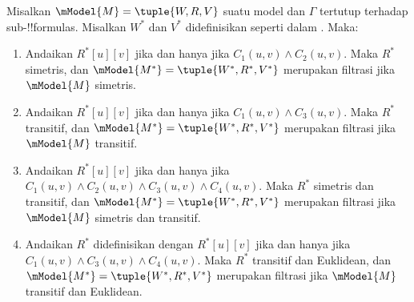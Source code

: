 \documentclass[../../../include/open-logic-section]{subfiles}
\begin{document}
\begin{thm}
  Misalkan $\mModel{M} =\tuple{W,R,V}$ suatu model dan $\Gamma$ tertutup
  terhadap sub-!!{formula}s. Misalkan $W^*$ dan $V^*$ didefinisikan seperti
  dalam . Maka:
  \begin{enumerate}
  \item Andaikan $R^*[u][v]$ jika dan hanya jika $C_1(u, v) \land
    C_2(u,v)$. Maka $R^*$ simetris, dan
    $\mModel{M^*} = \tuple{W^*,R^*,V^*}$ merupakan filtrasi jika
    $\mModel{M}$ simetris.
  \item Andaikan $R^*[u][v]$ jika dan hanya jika $C_1(u, v)
    \land C_3(u,v)$. Maka $R^*$ transitif, dan
    $\mModel{M^*}=\tuple{W^*,R^*,V^*}$ merupakan filtrasi jika
    $\mModel{M}$ transitif.
  \item Andaikan $R^*[u][v]$ jika dan hanya jika $C_1(u, v) \land C_2(u,v)
    \land C_3(u,v) \land C_4(u,v)$. Maka $R^*$ simetris dan transitif, dan
    $\mModel{M^*}=\tuple{W^*,R^*,V^*}$ merupakan filtrasi jika
    $\mModel{M}$ simetris dan transitif.
  \item Andaikan $R^*$ didefinisikan dengan $R^*[u][v]$ jika dan hanya jika
    $C_1(u, v) \land C_3(u,v) \land C_4(u,v)$. Maka $R^*$ transitif dan
    Euklidean, dan $\mModel{M^*}=\tuple{W^*,R^*,V^*}$ merupakan filtrasi jika
    $\mModel{M}$ transitif dan Euklidean.
  \end{enumerate}
\end{thm}
\end{document}
